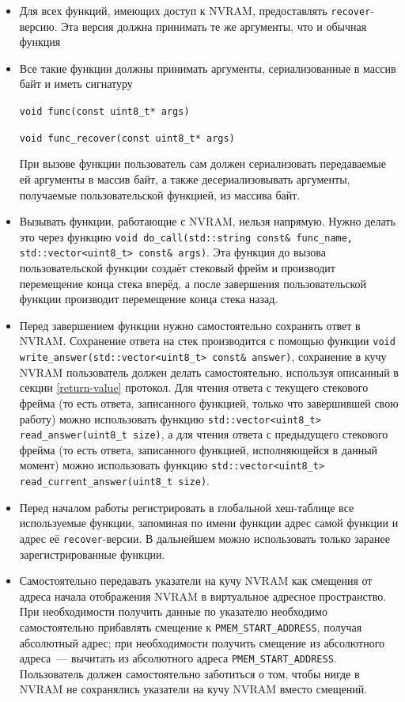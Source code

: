 \documentclass[times,specification,annotation]{itmo-student-thesis}
\begin{document}
\begin{itemize}
    \item Для всех функций, имеющих доступ к NVRAM, предоставлять \texttt{recover}-версию. Эта версия должна принимать те же аргументы, что и обычная функция
    
    \item Все такие функции должны принимать аргументы, сериализованные в массив байт и иметь сигнатуру
        
        \texttt{void func(const uint8\_t* args)}
        
        
        \texttt{void func\_recover(const uint8\_t* args)} 
        
    При вызове функции пользователь сам должен сериализовать передаваемые ей аргументы в массив байт, а также десериализовывать аргументы, получаемые пользовательской функцией, из массива байт.

    \item Вызывать функции, работающие с NVRAM, нельзя напрямую. Нужно делать это через функцию \texttt{void do\_call(std::string const& func\_name, std::vector<uint8\_t> const& args)}. Эта функция до вызова пользовательской функции создаёт стековый фрейм и производит перемещение конца стека вперёд, а после завершения пользовательской функции производит перемещение конца стека назад.
    
    \item Перед завершением функции нужно самостоятельно сохранять ответ в NVRAM. Сохранение ответа на стек производится с помощью функции \texttt{void write\_answer(std::vector<uint8\_t> const& answer)}, сохранение в кучу NVRAM пользователь должен делать самостоятельно, используя описанный в секции \ref{return-value} протокол. Для чтения ответа с текущего стекового фрейма (то есть ответа, записанного функцией, только что завершившей свою работу) можно использовать функцию \texttt{std::vector<uint8\_t> read\_answer(uint8\_t size)}, а для чтения ответа с предыдущего стекового фрейма (то есть ответа, записанного функцией, исполняющейся в данный момент) можно использовать функцию \texttt{std::vector<uint8\_t> read\_current\_answer(uint8\_t size)}.
    
    \item Перед началом работы регистрировать в глобальной хеш-таблице все используемые функции, запоминая по имени функции адрес самой функции и адрес её \texttt{recover}-версии. В дальнейшем можно использовать только заранее зарегистрированные функции.
    
    \item Самостоятельно передавать указатели на кучу NVRAM как смещения от адреса начала отображения NVRAM в виртуальное адресное пространство. При необходимости получить данные по указателю необходимо самостоятельно прибавлять смещение к \texttt{PMEM\_START\_ADDRESS}, получая абсолютный адрес; при необходимости получить смещение из абсолютного адреса~--- вычитать из абсолютного адреса \texttt{PMEM\_START\_ADDRESS}. Пользователь должен самостоятельно заботиться о том, чтобы нигде в NVRAM не сохранялись указатели на кучу NVRAM вместо смещений.
\end{itemize}
\end{document}
